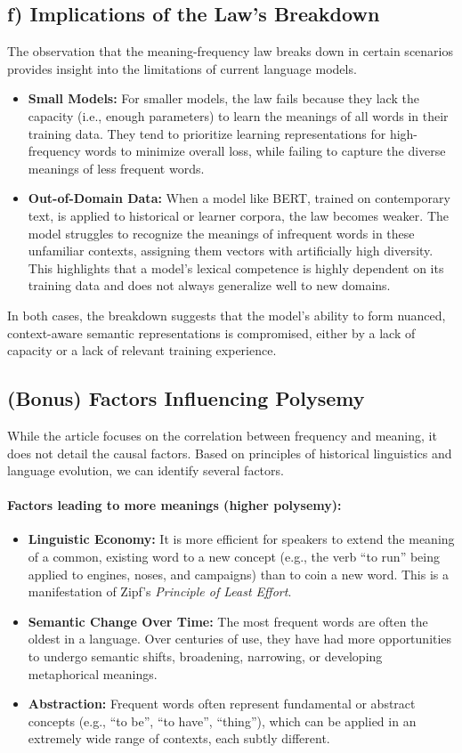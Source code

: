 \documentclass{solutionclass} %
\begin{document}
\subsection{f) Implications of the Law's Breakdown}
The observation that the meaning-frequency law breaks down in certain scenarios provides insight into the limitations of current language models.
\begin{itemize}
    \item \textbf{Small Models:} For smaller models, the law fails because they lack the capacity (i.e., enough parameters) to learn the meanings of all words in their training data. They tend to prioritize learning representations for high-frequency words to minimize overall loss, while failing to capture the diverse meanings of less frequent words.
    \item \textbf{Out-of-Domain Data:} When a model like BERT, trained on contemporary text, is applied to historical or learner corpora, the law becomes weaker. The model struggles to recognize the meanings of infrequent words in these unfamiliar contexts, assigning them vectors with artificially high diversity. This highlights that a model's lexical competence is highly dependent on its training data and does not always generalize well to new domains.
\end{itemize}
In both cases, the breakdown suggests that the model's ability to form nuanced, context-aware semantic representations is compromised, either by a lack of capacity or a lack of relevant training experience.

\subsection{(Bonus) Factors Influencing Polysemy}
While the article focuses on the correlation between frequency and meaning, it does not detail the causal factors. Based on principles of historical linguistics and language evolution, we can identify several factors.

\paragraph{Factors leading to more meanings (higher polysemy):}
\begin{itemize}
    \item \textbf{Linguistic Economy:} It is more efficient for speakers to extend the meaning of a common, existing word to a new concept (e.g., the verb ``to run'' being applied to engines, noses, and campaigns) than to coin a new word. This is a manifestation of Zipf's \emph{Principle of Least Effort}.
    \item \textbf{Semantic Change Over Time:} The most frequent words are often the oldest in a language. Over centuries of use, they have had more opportunities to undergo semantic shifts, broadening, narrowing, or developing metaphorical meanings.
    \item \textbf{Abstraction:} Frequent words often represent fundamental or abstract concepts (e.g., ``to be'', ``to have'', ``thing''), which can be applied in an extremely wide range of contexts, each subtly different.
\end{itemize}
\end{document}
